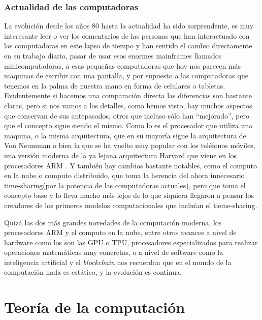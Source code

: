 \documentclass[letterpaper,12pt,oneside]{book}
\begin{document}
		\clearpage		

	
		\subsection{Actualidad de las computadoras}
		
		
		La evolución desde los años 80 hasta la actualidad ha sido sorprendente, es muy interesante leer o ver los comentarios de las personas que han interactuado
		con las computadoras en este lapso de tiempo y han sentido el cambio directamente en su trabajo diario, pasar de usar esos enormes mainframes
		llamados minicomputadoras, a esas pequeñas computadoras que hoy nos parecen más maquinas de escribir con una pantalla, y por supuesto a las 
		computadoras que tenemos en la palma de nuestra mano en forma de celulares o tabletas. Evidentemente si hacemos una comparación directa las diferencias
		son bastante claras, pero si nos vamos a los detalles, como hemos visto, hay muchos aspectos que conservan de sus antepasados, otros que incluso sólo
		han ``mejorado'', pero que el concepto sigue siendo el mismo. Como lo es el procesador que utiliza una maquina, o la misma arquitectura, que en su mayoría sigue la 
		arquitectura de Von Neumman o bien la que se ha vuelto muy popular con los teléfonos móviles, una versión moderna de la ya lejana
		arquitectura Harvard que viene en los procesadores ARM \cite[p. 109]{valvano_introduction_2017}. Y también hay cambios bastante notables, como el computo en la nube o 
		computo distribuido, que toma la 
		herencia del ahora innecesario time-sharing(por la potencia de las computadoras actuales), pero que toma el concepto base y lo lleva mucho más lejos de lo que siquiera 
		llegaron a pensar los creadores de los primeros modelos computacionales que incluían el tieme-sharing.
		
		Quizá las dos más grandes novedades de la computación moderna, los procesadores ARM y el computo en la nube, entre otros avances a nivel de hardware
		como los son las GPU o TPU, procesadores especializados para realizar operaciones matemáticas muy concretas, o a nivel de software como
		la inteligencia artificial y el \textit{blockchain} nos recuerdan que en el mundo de la computación nada es estático, y la evolución es continua.
		 

\chapter{Teoría de la computación} %
\end{document}
